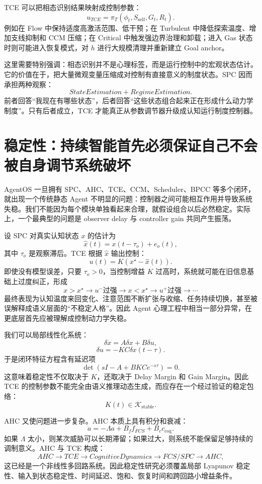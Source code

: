 TCE 可以把相态识别结果映射成控制参数：
\[
u_{TCE}
=
\pi_T
\left(
\phi_t,
S_{\mathrm{self}},
G_t,
R_t
\right).
\]
例如在 Flow 中保持适度高激活范围、低干预；在 Turbulent 中降低探索温度、增加支线抑制和 CCM 压缩；在 Critical 中触发强边界治理和卸载；进入 Gas 状态时则可能进入恢复模式，对 $h$ 进行大规模清理并重新建立 Goal anchor。

这里需要特别强调：相态识别并不是心理标签，而是运行控制中的宏观状态估计。它的价值在于，把大量微观变量压缩成对控制有直接意义的制度状态。SPC 因而承担两种观察：
\[
\boxed{
StateEstimation
+
RegimeEstimation.
}
\]
前者回答``我现在有哪些状态''，后者回答``这些状态组合起来正在形成什么动力学制度''。只有后者成立，TCE 才能真正从参数调节器升级成认知运行制度控制器。

\section{稳定性：持续智能首先必须保证自己不会被自身调节系统破坏}

AgentOS 一旦拥有 SPC、AHC、TCE、CCM、Scheduler、BPCC 等多个闭环，就出现一个传统静态 Agent 不明显的问题：控制器之间可能相互作用并导致系统失稳。我们不能因为每个模块单独看起来合理，就假设组合以后必然稳定。实际上，一个最典型的问题是 observer delay 与 controller gain 共同产生振荡。

设 SPC 对真实认知状态 $x$ 的估计为
\[
\hat{x}(t)
=
x(t-\tau_o)+e_o(t),
\]
其中 $\tau_o$ 是观察滞后。TCE 根据 $\hat x$ 输出控制：
\[
u(t)
=
K
\left(
x^\star-\hat{x}(t)
\right).
\]
即使没有模型误差，只要 $\tau_o>0$，当控制增益 $K$ 过高时，系统就可能在旧信息基础上过度纠正，形成
\[
x>x^\star
\rightarrow
u^- \text{过强}
\rightarrow
x<x^\star
\rightarrow
u^+ \text{过强}
\rightarrow\cdots
\]
最终表现为认知温度来回变化、注意范围不断扩张与收缩、任务持续切换，甚至被误解释成语义层面的``不稳定人格''。因此 Agent 心理工程中相当一部分异常，在更底层首先应被理解成控制动力学失稳。

我们可以局部线性化系统：
\[
\delta\dot{x}
=
A\delta x
+
B\delta u,
\]
\[
\delta u
=
-KC\delta x(t-\tau).
\]
于是闭环特征方程含有延迟项
\[
\det
\left(
sI-A+BKC e^{-s\tau}
\right)=0.
\]
这意味着稳定性不仅取决于 $K$，还取决于 Delay Margin 和 Gain Margin。因此 TCE 的控制参数不能完全由语义推理动态生成，而应存在一个经过验证的稳定包络：
\[
K(t)\in\mathcal K_{\mathrm{stable}}.
\]

AHC 又使问题进一步复杂。AHC 本质上具有积分和衰减：
\[
\dot a
=
-\Lambda a
+
B_f f_{FCS}
+
B_c c_{\mathrm{cog}}.
\]
如果 $\Lambda$ 太小，则某次威胁可以长期滞留；如果过大，则系统不能保留足够持续的调制意义。AHC 与 TCE 构成：
\[
AHC
\rightarrow
TCE
\rightarrow
CognitiveDynamics
\rightarrow
FCS/SPC
\rightarrow
AHC,
\]
这已经是一个非线性多回路系统。因此稳定性研究必须覆盖局部 Lyapunov 稳定性、输入到状态稳定性、时间延迟、饱和、恢复时间和跨回路小增益条件。

